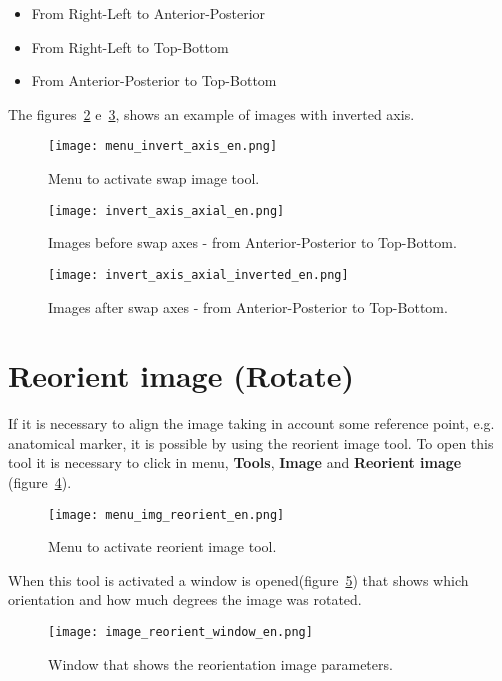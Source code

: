 \begin{itemize}
	\item From Right-Left to Anterior-Posterior
	\item From Right-Left to Top-Bottom
	\item From Anterior-Posterior to Top-Bottom
\end{itemize}


The figures~\ref{fig:invert_axis_axial} e~\ref{fig:invert_axis_axial_inverted}, shows an example of images with inverted axis.

\begin{figure}[!htb]
\centering
\texttt{[image: menu\_invert\_axis\_en.png]}
\caption{Menu to activate swap image tool.}
\label{fig:menu_invert_axis}
\end{figure}

\begin{figure}[!htb]
\centering
\texttt{[image: invert\_axis\_axial\_en.png]}
\caption{Images before swap axes - from Anterior-Posterior to Top-Bottom.}
\label{fig:invert_axis_axial}
\end{figure}

\begin{figure}[!htb]
\centering
\texttt{[image: invert\_axis\_axial\_inverted\_en.png]}
\caption{Images after swap axes - from Anterior-Posterior to Top-Bottom.}
\label{fig:invert_axis_axial_inverted}
\end{figure}

\section{Reorient image (Rotate)}

If it is necessary to align the image taking in account some reference point, e.g. anatomical marker, it is possible by using the reorient image tool. To open this tool it is necessary to click in menu, \textbf{Tools}, \textbf{Image} and \textbf{Reorient image} (figure~\ref{fig:menu_img_reorient}).

\begin{figure}[!htb]
\centering
\texttt{[image: menu\_img\_reorient\_en.png]}
\caption{Menu to activate reorient image tool.}
\label{fig:menu_img_reorient}
\end{figure}

When this tool is activated a window is opened(figure~\ref{fig:image_reorient_window}) that shows which orientation and how much degrees the image was rotated.
\begin{figure}[!htb]
\centering
\texttt{[image: image\_reorient\_window\_en.png]}
\caption{Window that shows the reorientation image parameters.}
\label{fig:image_reorient_window}
\end{figure}

